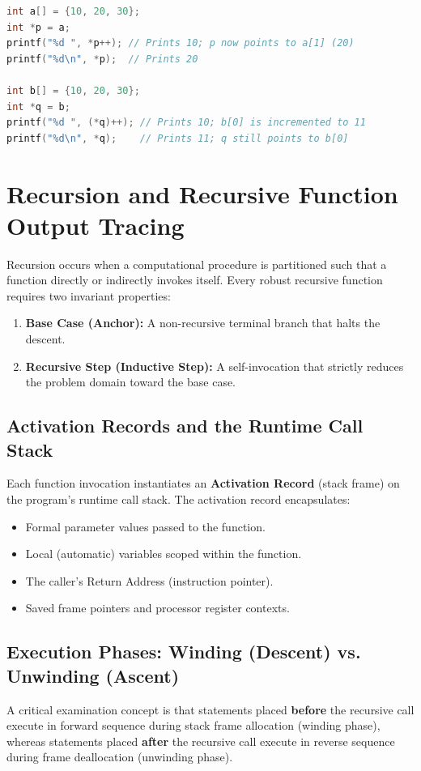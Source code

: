 \begin{lstlisting}[language=C]
int a[] = {10, 20, 30};
int *p = a;
printf("%d ", *p++); // Prints 10; p now points to a[1] (20)
printf("%d\n", *p);  // Prints 20

int b[] = {10, 20, 30};
int *q = b;
printf("%d ", (*q)++); // Prints 10; b[0] is incremented to 11
printf("%d\n", *q);    // Prints 11; q still points to b[0]
\end{lstlisting}

\section{Recursion and Recursive Function Output Tracing}
\label{sec:recursion_output_tracing}

Recursion occurs when a computational procedure is partitioned such that a function directly or indirectly invokes itself. Every robust recursive function requires two invariant properties:
\begin{enumerate}[leftmargin=*]
    \item \textbf{Base Case (Anchor):} A non-recursive terminal branch that halts the descent.
    \item \textbf{Recursive Step (Inductive Step):} A self-invocation that strictly reduces the problem domain toward the base case.
\end{enumerate}

\subsection{Activation Records and the Runtime Call Stack}
Each function invocation instantiates an \textbf{Activation Record} (stack frame) on the program's runtime call stack. The activation record encapsulates:
\begin{itemize}[leftmargin=*]
    \item Formal parameter values passed to the function.
    \item Local (automatic) variables scoped within the function.
    \item The caller's Return Address (instruction pointer).
    \item Saved frame pointers and processor register contexts.
\end{itemize}

\subsection{Execution Phases: Winding (Descent) vs. Unwinding (Ascent)}
A critical examination concept is that statements placed \textbf{before} the recursive call execute in forward sequence during stack frame allocation (winding phase), whereas statements placed \textbf{after} the recursive call execute in reverse sequence during frame deallocation (unwinding phase).

